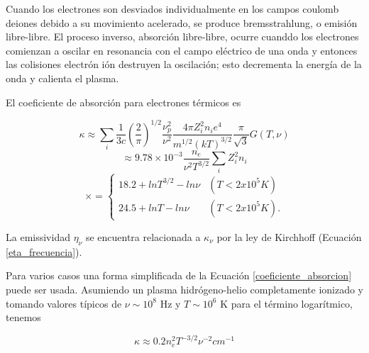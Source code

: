 Cuando los electrones son desviados individualmente en los campos coulomb deiones debido a su movimiento acelerado, se produce bremsstrahlung, o emisi\'on libre-libre. El proceso inverso, absorci\'on libre-libre, ocurre cuanddo los electrones comienzan a oscilar en resonancia con el campo el\'ectrico de una onda y entonces las colisiones electr\'on i\'on destruyen la oscilaci\'on; esto decrementa la energ\'ia de la onda y calienta el plasma.

El coeficiente de absorci\'on para electrones t\'ermicos es

\begin{equation*} \label{coeficiente1}
\kappa \approx \sum_{i} \frac{1}{3c} (\frac{2}{\pi})^{1/2} \frac{\nu_p^2}{\nu^2} \frac{4\pi Z_i^2 n_i e^4}{m^{1/2}(kT)^{3/2}} \frac{\pi}{\sqrt{3}}G(T,\nu)
\end{equation*}
\begin{equation*} \label{coeficiente2}
\approx 9.78 \times 10^{-3} \frac{n_e}{\nu^2T^{3/2}} \sum_i Z_i^2 n_i
\end{equation*}
\begin{equation} \label{coeficiente_absorcion}
\times =
    \begin{cases}
    18.2+ln T^{3/2}-ln\nu    & (T < 2 x 10^5 K)\\
    24.5+lnT-ln\nu           & (T < 2 x 10^5 K).
    \end{cases}
\end{equation}


La emissividad $\eta_\nu$ se encuentra relacionada a $\kappa_\nu$ por la ley de Kirchhoff (Ecuaci\'on \ref{eta_frecuencia}).

Para varios casos una forma simplificada de la Ecuaci\'on \ref{coeficiente_absorcion} puede ser usada. Asumiendo un plasma hidr\'ogeno-helio completamente ionizado y tomando valores t\'ipicos de $\nu \sim 10^8$ Hz y $T \sim 10^6$ K para el t\'ermino logar\'itmico, tenemos

\begin{equation} \label{coeficiente_absorcion_simple}
\kappa \approx 0.2 n_e^2T^{-3/2} \nu^{-2} cm^{-1}
\end{equation}

